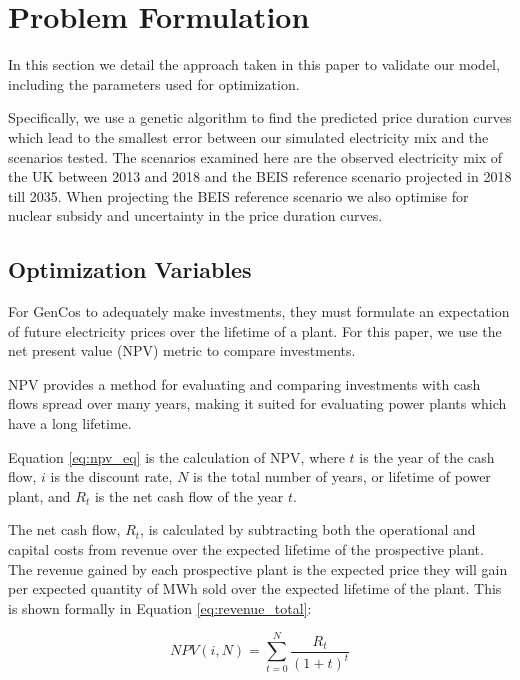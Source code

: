 \section{Problem Formulation}
\label{ssec:prob_formulation}

In this section we detail the approach taken in this paper to validate our model, including the parameters used for optimization. 

Specifically, we use a genetic algorithm to find the predicted price duration curves which lead to the smallest error between our simulated electricity mix and the scenarios tested. The scenarios examined here are the observed electricity mix of the UK between 2013 and 2018 and the BEIS reference scenario projected in 2018 till 2035. When projecting the BEIS reference scenario we also optimise for nuclear subsidy and uncertainty in the price duration curves.





\subsection{Optimization Variables}


For GenCos to adequately make investments, they must formulate an expectation of future electricity prices over the lifetime of a plant. For this paper, we use the net present value (NPV) metric to compare investments. 


NPV provides a method for evaluating and comparing investments with cash flows spread over many years, making it suited for evaluating power plants which have a long lifetime.  

Equation \ref{eq:npv_eq} is the calculation of NPV, where $t$ is the year of the cash flow, $i$ is the discount rate, $N$ is the total number of years, or lifetime of power plant, and $R_t$ is the net cash flow of the year $t$.

The net cash flow, $R_t$, is calculated by subtracting both the operational and capital costs from revenue over the expected lifetime of the prospective plant. The revenue gained by each prospective plant is the expected price they will gain per expected quantity of MWh sold over the expected lifetime of the plant. This is shown formally in Equation \ref{eq:revenue_total}:

\begin{equation} \label{eq:npv_eq}
NPV(i, N) = \sum_{t=0}^{N}\frac{R_t}{(1+t)^t}
\end{equation}




